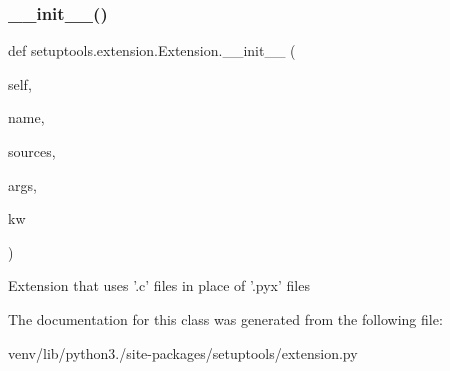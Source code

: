 \subsubsection{\texorpdfstring{\+\_\+\+\_\+init\+\_\+\+\_\+()}{\_\_init\_\_()}}
{\footnotesize\ttfamily def setuptools.\+extension.\+Extension.\+\_\+\+\_\+init\+\_\+\+\_\+ (\begin{DoxyParamCaption}\item[{}]{self,  }\item[{}]{name,  }\item[{}]{sources,  }\item[{}]{args,  }\item[{}]{kw }\end{DoxyParamCaption})}

\begin{DoxyVerb}Extension that uses '.c' files in place of '.pyx' files\end{DoxyVerb}
 

The documentation for this class was generated from the following file\+:\begin{DoxyCompactItemize}
\item 
venv/lib/python3./site-\/packages/setuptools/extension.\+py\end{DoxyCompactItemize}
